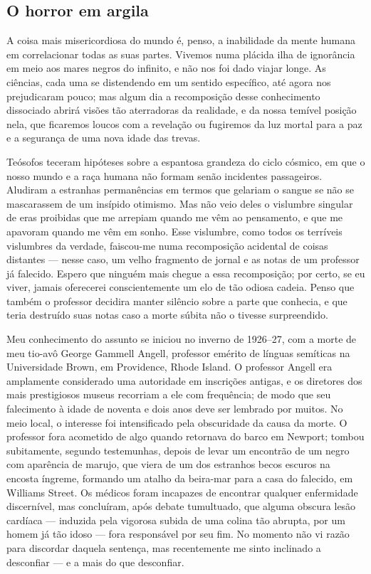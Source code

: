 \begin{pages}
\begin{Rightside}
\chapter{O horror em argila}


\noindent{}A coisa mais misericordiosa do mundo é, penso, a inabilidade da mente
humana em correlacionar todas as suas partes. Vivemos numa plácida ilha
de ignorância em meio aos mares negros do infinito, e não nos foi dado
viajar longe. As ciências, cada uma se distendendo em um sentido
específico, até agora nos prejudicaram pouco; mas algum dia a
recomposição desse conhecimento dissociado abrirá visões tão aterradoras
da realidade, e da nossa temível posição nela, que ficaremos loucos com
a revelação ou fugiremos da luz mortal para a paz e a segurança de uma
nova idade das trevas.

Teósofos teceram hipóteses sobre a espantosa grandeza do ciclo cósmico,
em que o nosso mundo e a raça humana não formam senão incidentes
passageiros. Aludiram a estranhas permanências em termos que gelariam o
sangue se não se mascarassem de um insípido otimismo. Mas não veio deles
o vislumbre singular de eras proibidas que me arrepiam quando me vêm ao
pensamento, e que me apavoram quando me vêm em sonho. Esse vislumbre,
como todos os terríveis vislumbres da verdade, faiscou-me numa
recomposição acidental de coisas distantes --- nesse caso, um velho
fragmento de jornal e as notas de um professor já falecido. Espero que
ninguém mais chegue a essa recomposição; por certo, se eu viver, jamais
oferecerei conscientemente um elo de tão odiosa cadeia. Penso que também
o professor decidira manter silêncio sobre a parte que conhecia, e que
teria destruído suas notas caso a morte súbita não o tivesse
surpreendido.

Meu conhecimento do assunto se iniciou no inverno de 1926--27, com a
morte de meu tio-avô George Gammell Angell, professor emérito de línguas
semíticas na Universidade Brown, em Providence, Rhode Island. O
professor Angell era amplamente considerado uma autoridade em inscrições
antigas, e os diretores dos mais prestigiosos museus recorriam a ele com
frequência; de modo que seu falecimento à idade de noventa e dois anos
deve ser lembrado por muitos. No meio local, o interesse foi
intensificado pela obscuridade da causa da morte. O professor fora
acometido de algo quando retornava do barco em Newport; tombou
subitamente, segundo testemunhas, depois de levar um encontrão de um
negro com aparência de marujo, que viera de um dos estranhos becos
escuros na encosta íngreme, formando um atalho da beira-mar para a casa
do falecido, em Williams Street. Os médicos foram incapazes de encontrar
qualquer enfermidade discernível, mas concluíram, após debate
tumultuado, que alguma obscura lesão cardíaca --- induzida pela vigorosa
subida de uma colina tão abrupta, por um homem já tão idoso --- fora
responsável por seu fim. No momento não vi razão para discordar daquela
sentença, mas recentemente me sinto inclinado a desconfiar --- e a mais 
do que desconfiar. 



\end{Rightside}
\end{pages}
